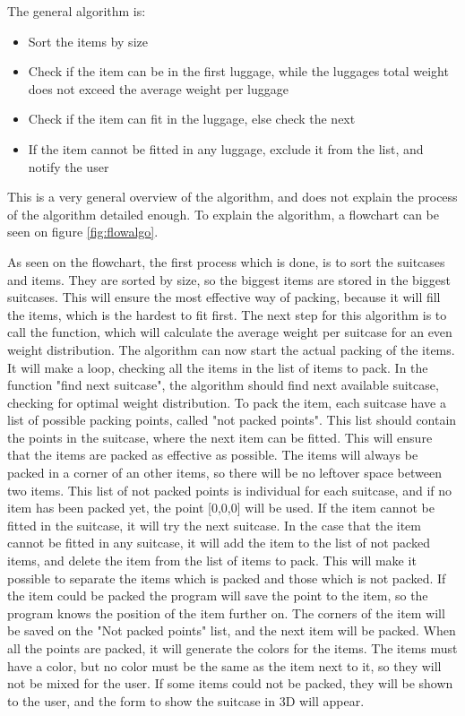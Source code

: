 The general algorithm is:
\begin{itemize}
	\item Sort the items by size
	\item Check if the item can be in the first luggage, while the luggages total weight does not exceed the average weight per luggage
	\item	Check if the item can fit in the luggage, else check the next
	\item  If the item cannot be fitted in any luggage, exclude it from the list, and notify the user
\end{itemize}

This is a very general overview of the algorithm, and does not explain the process of the algorithm detailed enough. To explain the algorithm, a flowchart can be seen on figure \ref{fig:flowalgo}.


As seen on the flowchart, the first process which is done, is to sort the suitcases and items. They are sorted by size, so the biggest items are stored in the biggest suitcases. This will ensure the most effective way of packing, because it will fill the items, which is the hardest to fit first. The next step for this algorithm is to call the function, which will calculate the average weight per suitcase for an even weight distribution. The algorithm can now start the actual packing of the items.
It will make a loop, checking all the items in the list of items to pack. In the function "find next suitcase", the algorithm should find next available suitcase, checking for optimal weight distribution. To pack the item, each suitcase have a list of possible packing points, called "not packed points". This list should contain the points in the suitcase, where the next item can be fitted. This will ensure that the items are packed as effective as possible. The items will always be packed in a corner of an other items, so there will be no leftover space between two items. This list of not packed points is individual for each suitcase, and if no item has been packed yet, the point [0,0,0] will be used. If the item cannot be fitted in the suitcase, it will try the next suitcase. In the case that the item cannot be fitted in any suitcase, it will add the item to the list of not packed items, and delete the item from the list of items to pack. This will make it possible to separate the items which is packed and those which is not packed. If the item could be packed the program will save the point to the item, so the program knows the position of the item further on. The corners of the item will be saved on the "Not packed points" list, and the next item will be packed.
When all the points are packed, it will generate the colors for the items. The items must have a color, but no color must be the same as the item next to it, so they will not be mixed for the user. If some items could not be packed, they will be shown to the user, and the form to show the suitcase in 3D will appear.

